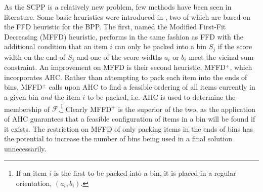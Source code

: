 \documentclass[authoryear]{elsarticle}
\begin{document}
\begin{comment}
A solution for the BPP remains feasible when an item is removed or a new item is added to a bin (provided the bin can accommodate said item), whereas this may render a solution for the SCPP infeasible, as the new adjacent score widths may not abide by the vicinal sum constraint. As a result of these differences, basic heuristics designed for the BPP cannot be used for the SCPP as there is no guarantee that the final solution will be feasible.  An example of this issue is provided in Fig.~\ref{fig:ffd} where a solution for an instance of the SCPP has been generated using FFD. The heuristic's inablity to rotate or reorder items produces alignments of items that violate the vicinal sum constraint in three of the bins, thus resulting in an entirely infeasible solution. Notice however that heuritics for the BPP can still produce feasible, albeit not optimal, solutions for the TPP and CSP-SDCL, as the only hard constraint in these problems is the requirement that no bin is overfilled~\eqref{eqn:capacity}.

\begin{figure}[h]	
	\centering
	
	\caption{An infeasible solution produced using FFD for an example instance of the SCPP. Here, $|\mathcal{I}| = 15$, $W = 1000$, $\tau = 70$, and the theoretical minimum $t = 6$.}	
	\label{fig:ffd}
\end{figure}
\end{comment}

As the SCPP is a relatively new problem, few methods have been seen in literature. Some basic heuristics were introduced in \citet{hawa2018}, two of which are based on the FFD heuristic for the BPP. The first, named the Modified First-Fit Decreasing (MFFD) heuristic, performs in the same fashion as FFD with the additional condition that an item $i$ can only be packed into a bin $S_j$ if the score width on the end of $S_j$ and one of the score widths $a_i$ or $b_i$ meet the vicinal sum constraint. An improvement on MFFD is their second heuristic, MFFD$^+$, which incorporates AHC. Rather than attempting to pack each item into the ends of bins, MFFD$^+$ calls upon AHC to find a feasible ordering of all items currently in a given bin \emph{and} the item $i$ to be packed, i.e. AHC is used to determine the membership of $\mathcal{F}$.\footnote{If an item $i$ is the first to be packed into a bin, it is placed in a regular orientation, $(a_i, b_i)$.} Clearly MFFD$^+$ is the superior of the two, as the application of AHC guarantees that a feasible configuration of items in a bin will be found if it exists. The restriction on MFFD of only packing items in the ends of bins has the potential to increase the number of bins being used in a final solution unnecessarily. 
\end{document}
